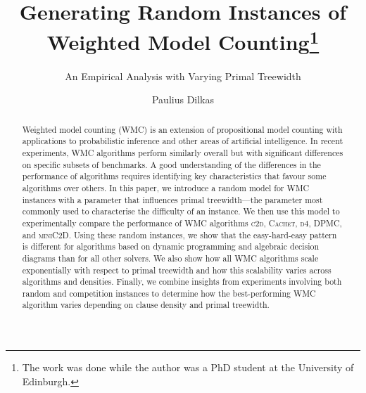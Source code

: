 \documentclass[runningheads]{llncs}
\begin{document}
\title{Generating Random Instances of\\Weighted Model Counting\thanks{The work
    was done while the author was a PhD student at the University of
    Edinburgh.}}
\subtitle{An Empirical Analysis with Varying Primal Treewidth}

\author{Paulius Dilkas}


\maketitle


\begin{abstract}
  Weighted model counting (\textsf{WMC}) is an extension of propositional model
  counting with applications to probabilistic inference and other areas of
  artificial intelligence. In recent experiments, \textsf{WMC} algorithms
  perform similarly overall but with significant differences on specific subsets
  of benchmarks. A good understanding of the differences in the performance of
  algorithms requires identifying key characteristics that favour some
  algorithms over others. In this paper, we introduce a random model for
  \textsf{WMC} instances with a parameter that influences primal treewidth---the
  parameter most commonly used to characterise the difficulty of an instance. We
  then use this model to experimentally compare the performance of \textsf{WMC}
  algorithms \textsc{c2d}, \textsc{Cachet}, \textsc{d4}, \textsc{DPMC}, and
  \textsc{miniC2D}. Using these random instances, we show that the
  easy-hard-easy pattern is different for algorithms based on dynamic
  programming and algebraic decision diagrams than for all other solvers. We
  also show how all \textsf{WMC} algorithms scale exponentially with respect to
  primal treewidth and how this scalability varies across algorithms and
  densities. Finally, we combine insights from experiments involving both random
  and competition instances to determine how the best-performing \textsf{WMC}
  algorithm varies depending on clause density and primal treewidth.

\end{abstract}
\end{document}
